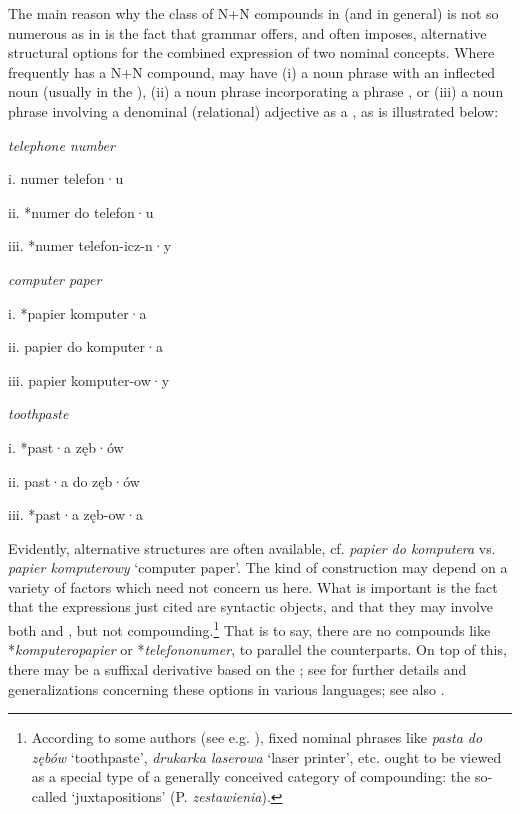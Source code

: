 \documentclass[output=paper]{LSP/langsci}
\begin{document}
\largerpage
The main reason why the class of N+N compounds in  (and  in general) is not so numerous as in  is the fact that  grammar offers, and often imposes, alternative structural options for the combined expression of two nominal concepts. Where  frequently has a N+N compound,  may have (i) a noun phrase with an inflected noun  (usually in the ), (ii) a noun phrase incorporating a  phrase , or (iii) a noun phrase involving a denominal (relational) adjective as a , as is illustrated below:

\ea\label{ex:szymanek:10} 
\ea 
{\textit{telephone number}}

 {i.     numer telefon}·{u} 

 {ii.   *numer do telefon}·{u}

 {iii.   *numer telefon-icz-n}·{y}

 \ex 
 {\textit{computer paper}}

 {i.     *papier komputer}·{a}

 {ii.   papier do komputer}·{a}

 {iii.   papier komputer-ow}·{y}

\ex 
{\textit{toothpaste}}

 {i.     *past}·{a zęb}·{ów}


 {ii.   past}·{a do zęb}·{ów}

 {iii.   *past}·{a zęb-ow}·{a}
\z 
\z 

{Evidently, alternative structures are often available, cf.} {\textit{papier do komputera}} {vs.} {\textit{papier komputerowy} }{‘computer paper’. The kind of construction may depend on a variety of factors which need not concern us here. What is important is the fact that the  expressions just cited are syntactic objects, and that they may involve both  and , but not compounding.}\footnote{{According to some  authors (see e.g. \citealt[120]{Jadacka2005}), fixed nominal phrases like} {\textit{pasta do zębów}} {‘toothpaste’,} {\textit{drukarka laserowa}} {‘laser printer’, etc. ought to be viewed as a special type of a generally conceived category of compounding: the so-called ‘juxtapositions’ (P.} {\textit{zestawienia}}). } {That is to say, there are no compounds like *}{\textit{komputeropapier}} {or *}{\textit{telefononumer}}{, to parallel the  counterparts. On top of this, there may be a suffixal derivative based on the ; see \citet{Ohnheiser2015} for further details and generalizations concerning these options in various  languages; see also \citet{tenHacken2013}.}
\end{document}
